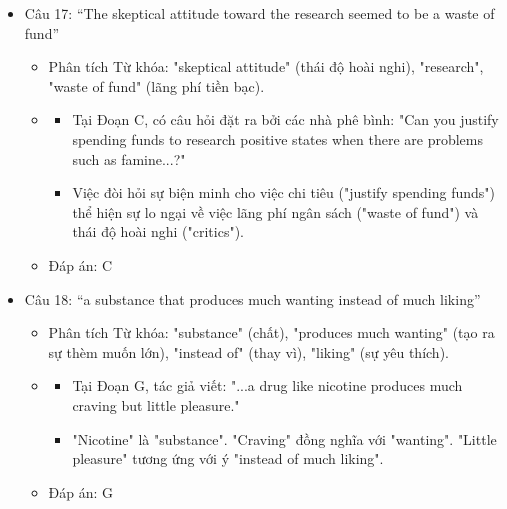 \documentclass{../templateReading/cdreading}
\begin{document}
\begin{itemize}
\begin{itemize}
\begin{itemize}
\item Tại Đoạn F, tác giả so sánh: "When subjects see landscapes (positive)... frontal lobe... becomes active. But when they are shown unpleasant images (negative)... response comes from more primitive parts..."
\item Từ "But" thể hiện sự tương phản (Contrast). Sự khác biệt giữa hoạt động của "frontal lobe" và "primitive parts" chính là "brains' action".
\end{itemize}
\item Đáp án: F
\end{itemize}
\item Câu 17: “The skeptical attitude toward the research seemed to be a waste of fund”
\begin{itemize}
\item Phân tích Từ khóa: "skeptical attitude" (thái độ hoài nghi), "research", "waste of fund" (lãng phí tiền bạc).
\item {}
\begin{itemize}
\item Tại Đoạn C, có câu hỏi đặt ra bởi các nhà phê bình: "Can you justify spending funds to research positive states when there are problems such as famine...?"
\item Việc đòi hỏi sự biện minh cho việc chi tiêu ("justify spending funds") thể hiện sự lo ngại về việc lãng phí ngân sách ("waste of fund") và thái độ hoài nghi ("critics").
\end{itemize}
\item Đáp án: C
\end{itemize}
\item Câu 18: “a substance that produces much wanting instead of much liking”
\begin{itemize}
\item Phân tích Từ khóa: "substance" (chất), "produces much wanting" (tạo ra sự thèm muốn lớn), "instead of" (thay vì), "liking" (sự yêu thích).
\item {}
\begin{itemize}
\item Tại Đoạn G, tác giả viết: "...a drug like nicotine produces much craving but little pleasure."
\item "Nicotine" là "substance". "Craving" đồng nghĩa với "wanting". "Little pleasure" tương ứng với ý "instead of much liking".
\end{itemize}
\item Đáp án: G

\end{itemize}
\end{itemize}
\end{document}

